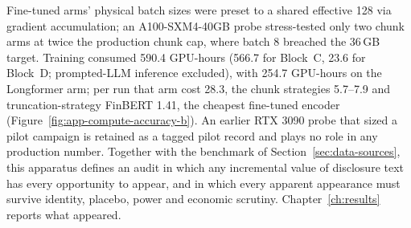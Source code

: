 Fine-tuned arms' physical batch sizes were preset to a shared effective 128 via gradient accumulation; an A100-SXM4-40GB probe stress-tested only two chunk arms at twice the production chunk cap, where batch 8 breached the 36\,GB target. %
Training consumed 590.4 GPU-hours (566.7 for Block~C, 23.6 for Block~D; prompted-LLM inference excluded), with 254.7 GPU-hours on the Longformer arm; per run that arm cost 28.3, the chunk strategies 5.7--7.9 and truncation-strategy FinBERT 1.41, the cheapest fine-tuned encoder (Figure~\ref{fig:app-compute-accuracy-b}). %
An earlier RTX 3090 probe that sized a pilot campaign is retained as a tagged pilot record and plays no role in any production number. %
Together with the benchmark of Section~\ref{sec:data-sources}, this apparatus defines an audit in which any incremental value of disclosure text has every opportunity to appear, and in which every apparent appearance must survive identity, placebo, power and economic scrutiny. Chapter~\ref{ch:results} reports what appeared.
